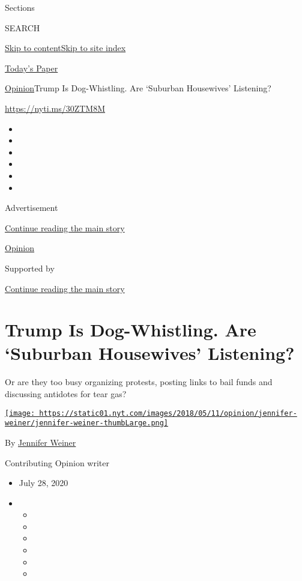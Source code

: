 Sections

SEARCH

\protect\hyperlink{site-content}{Skip to
content}\protect\hyperlink{site-index}{Skip to site index}

\href{https://myaccount.nytimes.com/auth/login?response_type=cookie\&client_id=vi}{}

\href{https://www.nytimes.com/section/todayspaper}{Today's Paper}

\href{/section/opinion}{Opinion}\textbar{}Trump Is Dog-Whistling. Are
`Suburban Housewives' Listening?

\url{https://nyti.ms/30ZTM8M}

\begin{itemize}
\item
\item
\item
\item
\item
\item
\end{itemize}

Advertisement

\protect\hyperlink{after-top}{Continue reading the main story}

\href{/section/opinion}{Opinion}

Supported by

\protect\hyperlink{after-sponsor}{Continue reading the main story}

\hypertarget{trump-is-dog-whistling-are-suburban-housewives-listening}{%
\section{Trump Is Dog-Whistling. Are `Suburban Housewives'
Listening?}\label{trump-is-dog-whistling-are-suburban-housewives-listening}}

Or are they too busy organizing protests, posting links to bail funds
and discussing antidotes for tear gas?

\href{https://www.nytimes.com/by/jennifer-weiner}{\texttt{[image: https://static01.nyt.com/images/2018/05/11/opinion/jennifer-weiner/jennifer-weiner-thumbLarge.png]}}

By \href{https://www.nytimes.com/by/jennifer-weiner}{Jennifer Weiner}

Contributing Opinion writer

\begin{itemize}
\item
  July 28, 2020
\item
  \begin{itemize}
  \item
  \item
  \item
  \item
  \item
  \item
  \end{itemize}
\end{itemize}

